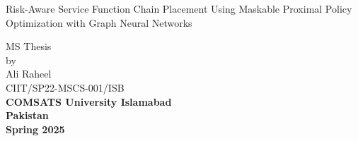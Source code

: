 \documentclass[A4paper,12pt]{report}
\theoremstyle{plain}
\theoremstyle{definition}
\theoremstyle{remark}
\numberwithin{equation}{section}
\begin{document}
\thispagestyle{empty}
\begin{center}
{\Huge{Risk-Aware Service Function Chain Placement Using Maskable Proximal Policy Optimization with Graph Neural Networks}}
\end{center}
\vspace{0.1in}
\begin{center}
\vspace{.8in}
\Large{MS Thesis}\\
\large{ by}\\
\Large {Ali Raheel}\\
\vspace{0.35in}
CIIT/SP22-MSCS-001/ISB\\
\vspace{2in}
\Large {\textbf{COMSATS University Islamabad\\
Pakistan}}\\
\vspace{0.2in}
\Large{\textbf{Spring 2025}}
\end{center}

\newpage
\vspace{-1in}
\begin{center}
\end{center}
\end{document}
